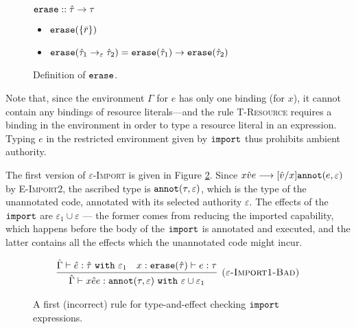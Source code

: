 \begin{figure}[h]
\vspace{-5pt}

$\mathtt{erase} :: \hat \tau \rightarrow \tau$
\begin{itemize}
	\setlength\itemsep{-0.2em}
	\item[] $\mathtt{erase}(\{ \bar r \})$
	\item[] $\mathtt{erase}(\hat \tau_1 \rightarrow_{\varepsilon} \hat \tau_2) = \mathtt{erase}(\hat \tau_1) \rightarrow \mathtt{erase}(\hat \tau_2)$
\end{itemize}

\vspace{-7pt}
\caption{Definition of $\mathtt{erase}$.}
\label{fig:erase_defn}
\end{figure}

Note that, since the environment $\Gamma$ for $e$ has only one binding (for $x$), it cannot contain any bindings of resource literals---and the rule \textsc{T-Resource} requires a binding in the environment in order to type a resource literal in an expression. Typing $e$ in the restricted environment given by $\mathtt{import}$ thus prohibits ambient authority.

The first version of \textsc{$\varepsilon$-Import} is given in Figure \ref{fig:import_rule_1}. Since ${x}{\hat v}{e} \longrightarrow [\hat v/x]\mathtt{annot}(e, \varepsilon)$ by \textsc{E-Import2}, the ascribed type is $\mathtt{annot}(\tau, \varepsilon)$, which is the type of the unannotated code, annotated with its selected authority $\varepsilon$. The effects of the $\mathtt{import}$ are $\varepsilon_1 \cup \varepsilon$ --- the former comes from reducing the imported capability, which happens before the body of the $\mathtt{import}$ is annotated and executed, and the latter contains all the effects which the unannotated code might incur.


\begin{figure}[h]

\[
\begin{array}{c}

\infer[\textsc{($\varepsilon$-Import1-Bad)}]
	{ \hat \Gamma \vdash {x}{\hat e}{e}: \kwa{annot}(\tau, \varepsilon)~\kw{with} \varepsilon \cup \varepsilon_1 }
	{ \hat \Gamma \vdash \hat e: \hat \tau~\kw{with} \varepsilon_1 & x: \kwa{erase}(\hat \tau) \vdash e: \tau }

\end{array}
\]
\vspace{-7pt}
\caption{A first (incorrect) rule for type-and-effect checking $\mathtt{import}$ expressions.}
\label{fig:import_rule_1}
\end{figure}

